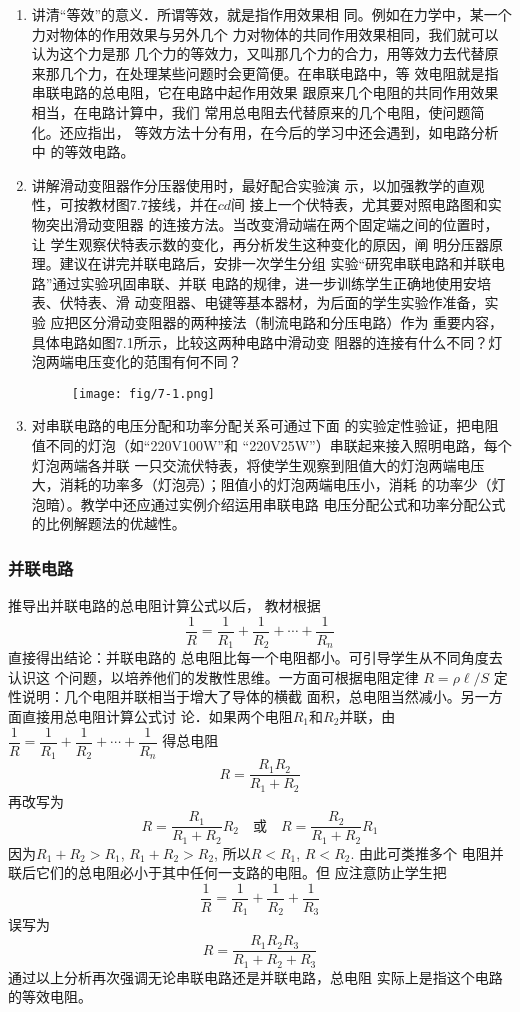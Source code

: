 \begin{enumerate}
    \item 讲清“等效”的意义．所谓等效，就是指作用效果相
同。例如在力学中，某一个力对物体的作用效果与另外几个
力对物体的共同作用效果相同，我们就可以认为这个力是那
几个力的等效力，又叫那几个力的合力，用等效力去代替原
来那几个力，在处理某些问题时会更简便。在串联电路中，等
效电阻就是指串联电路的总电阻，它在电路中起作用效果
跟原来几个电阻的共同作用效果相当，在电路计算中，我们
常用总电阻去代替原来的几个电阻，使问题简化。还应指出，
等效方法十分有用，在今后的学习中还会遇到，如电路分析中
的等效电路。
\item 讲解滑动变阻器作分压器使用时，最好配合实验演
示，以加强教学的直观性，可按教材图7.7接线，并在$cd$间
接上一个伏特表，尤其要对照电路图和实物突出滑动变阻器
的连接方法。当改变滑动端在两个固定端之间的位置时，让
学生观察伏特表示数的变化，再分析发生这种变化的原因，阐
明分压器原理。建议在讲完并联电路后，安排一次学生分组
实验“研究串联电路和并联电路”通过实验巩固串联、并联
电路的规律，进一步训练学生正确地使用安培表、伏特表、滑
动变阻器、电键等基本器材，为后面的学生实验作准备，实验
应把区分滑动变阻器的两种接法（制流电路和分压电路）作为
重要内容，具体电路如图7.1所示，比较这两种电路中滑动变
阻器的连接有什么不同？灯泡两端电压变化的范围有何不同？

\begin{figure}[htp]
    \centering
  \texttt{[image: fig/7-1.png]}
    \caption{}
\end{figure}
\item 对串联电路的电压分配和功率分配关系可通过下面
的实验定性验证，把电阻值不同的灯泡（如“220V100W”和
“220V25W”）串联起来接入照明电路，每个灯泡两端各并联
一只交流伏特表，将使学生观察到阻值大的灯泡两端电压
大，消耗的功率多（灯泡亮）；阻值小的灯泡两端电压小，消耗
的功率少（灯泡暗）。教学中还应通过实例介绍运用串联电路
电压分配公式和功率分配公式的比例解题法的优越性。
\end{enumerate}

\subsubsection{并联电路}

推导出并联电路的总电阻计算公式以后，
教材根据
\[\frac{1}{R}=\frac{1}{R_1}+\frac{1}{R_2}+\cdots+\frac{1}{R_n}\]
直接得出结论：并联电路的
总电阻比每一个电阻都小。可引导学生从不同角度去认识这
个问题，以培养他们的发散性思维。一方面可根据电阻定律
$R=\rho\ell/S$
定性说明：几个电阻并联相当于增大了导体的横截
面积，总电阻当然减小。另一方面直接用总电阻计算公式讨
论．如果两个电阻$R_1$和$R_2$并联，由
$\dfrac{1}{R}=\dfrac{1}{R_1}+\dfrac{1}{R_2}+\cdots+\dfrac{1}{R_n}$
得总电阻
\[R=\frac{R_1R_2}{R_1+R_2}\]
再改写为
\[R=\frac{R_1}{R_1+R_2}R_2\quad \text{或}\quad R=\frac{R_2}{R_1+R_2}R_1\]
因为$R_1+R_2>R_1$, $R_1+R_2>R_2$, 所以$R<R_1$, $R<R_2$. 由此可类推多个
电阻并联后它们的总电阻必小于其中任何一支路的电阻。但
应注意防止学生把
\[\frac{1}{R}=\frac{1}{R_1}+\frac{1}{R_2}+\frac{1}{R_3}\]
误写为
\[R=\frac{R_1R_2R_3}{R_1+R_2+R_3}\]
通过以上分析再次强调无论串联电路还是并联电路，总电阻
实际上是指这个电路的等效电阻。

